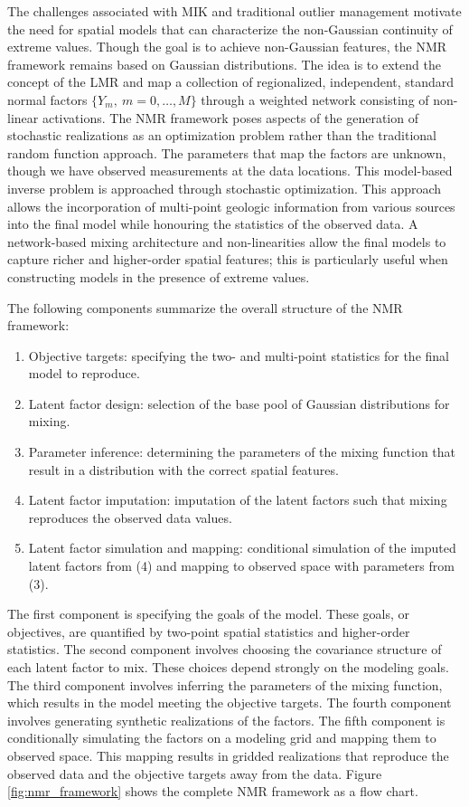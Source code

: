 The challenges associated with \gls{MIK} and traditional outlier management motivate the need for spatial models that can characterize the non-Gaussian continuity of extreme values. Though the goal is to achieve non-Gaussian features, the \gls{NMR} framework remains based on Gaussian distributions. The idea is to extend the concept of the \gls{LMR} and map a collection of regionalized, independent, standard normal factors $\{ Y_{m}, \ m = 0, \dots, M\}$ through a weighted network consisting of non-linear activations. The \gls{NMR} framework poses aspects of the generation of stochastic realizations as an optimization problem rather than the traditional random function approach. The parameters that map the factors are unknown, though we have observed measurements at the data locations. This model-based inverse problem is approached through stochastic optimization. This approach allows the incorporation of multi-point geologic information from various sources into the final model while honouring the statistics of the observed data. A network-based mixing architecture and non-linearities allow the final models to capture richer and higher-order spatial features; this is particularly useful when constructing models in the presence of extreme values.

The following components summarize the overall structure of the \gls{NMR} framework:
\begin{enumerate}[noitemsep]
    \item Objective targets: specifying the two- and multi-point statistics for the final model to reproduce.
    \item Latent factor design: selection of the base pool of Gaussian distributions for mixing.
    \item Parameter inference: determining the parameters of the mixing function that result in a distribution with the correct spatial features.
    \item Latent factor imputation: imputation of the latent factors such that mixing reproduces the observed data values.
    \item Latent factor simulation and mapping: conditional simulation of the imputed latent factors from (4) and mapping to observed space with parameters from (3).
\end{enumerate}

The first component is specifying the goals of the model. These goals, or objectives, are quantified by two-point spatial statistics and higher-order statistics. The second component involves choosing the covariance structure of each latent factor to mix. These choices depend strongly on the modeling goals. The third component involves inferring the parameters of the mixing function, which results in the model meeting the objective targets. The fourth component involves generating synthetic realizations of the factors. The fifth component is conditionally simulating the factors on a modeling grid and mapping them to observed space. This mapping results in gridded realizations that reproduce the observed data and the objective targets away from the data. Figure \ref{fig:nmr_framework} shows the complete \gls{NMR} framework as a flow chart. 

